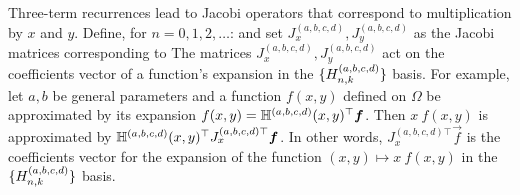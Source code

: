 Three-term recurrences lead to Jacobi operators that correspond to multiplication by $x$ and $y$. Define, for $n=0,1,2,\dots$:  
and set $J_x^{(a,b,c,d)}, J_y^{(a,b,c,d)}$ as the Jacobi matrices corresponding to
The matrices $J_x^{(a,b,c,d)}, J_y^{(a,b,c,d)}$ act on the coefficients vector of a function's expansion in the $\{H_{n,k}^{(a,b,c,d)}\}$ basis. For example, let $a, b$ be general parameters and a function $f(x,y)$ defined on $\Omega$ be approximated by its expansion $f(x,y) = \mathbb{H}^{(a,b,c,d)}(x,y)^\top \bm{f}$. Then $x \: f(x,y)$ is approximated by $\mathbb{H}^{(a,b,c,d)}(x,y)^\top {J_x^{(a,b,c,d)\top}} \bm{f}$. In other words, ${J_x^{(a,b,c,d)\top}} \vec{f}$ is the coefficients vector for the expansion of the function $(x,y) \mapsto x \: f(x,y)$ in the $\{H_{n,k}^{(a,b,c,d)}\}$ basis. 

